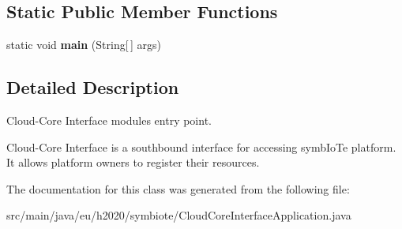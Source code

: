 \subsection*{Static Public Member Functions}
\begin{DoxyCompactItemize}
\item 
static void {\bfseries main} (String\mbox{[}$\,$\mbox{]} args)\hypertarget{classeu_1_1h2020_1_1symbiote_1_1CloudCoreInterfaceApplication_a19264807749c01cd7938facb44578f43}{}\label{classeu_1_1h2020_1_1symbiote_1_1CloudCoreInterfaceApplication_a19264807749c01cd7938facb44578f43}

\end{DoxyCompactItemize}


\subsection{Detailed Description}
Cloud-\/\+Core Interface module\textquotesingle{}s entry point. 

Cloud-\/\+Core Interface is a southbound interface for accessing symb\+Io\+Te platform. It allows platform owners to register their resources. 

The documentation for this class was generated from the following file\+:\begin{DoxyCompactItemize}
\item 
src/main/java/eu/h2020/symbiote/Cloud\+Core\+Interface\+Application.\+java\end{DoxyCompactItemize}
